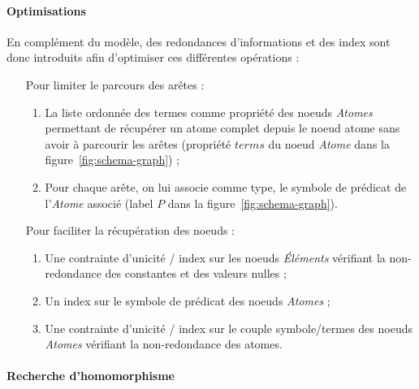 \paragraph{Optimisations}
En complément du modèle, des redondances d'informations et des index sont donc introduits afin d'optimiser ces différentes opérations :
\begin{itemize}[wide=0pt]
    \item[Pour limiter le parcours des arêtes] :
        \begin{enumerate}
            \item La liste ordonnée des termes comme propriété des noeuds \textit{Atomes} permettant de récupérer un atome complet depuis le noeud atome sans avoir à parcourir les arêtes (propriété $terms$ du noeud \textit{Atome} dans la figure~\ref{fig:schema-graph}) ;
            \item Pour chaque arête, on lui associe comme type, le symbole de prédicat de l'\textit{Atome} associé (label $P$ dans la figure~\ref{fig:schema-graph}).
        \end{enumerate}
    \item[Pour faciliter la récupération des noeuds] :
        \begin{enumerate}
            \item Une contrainte d'unicité / index sur les noeuds \textit{Éléments} vérifiant la non-redondance des constantes et des valeurs nulles ;
            \item Un index sur le symbole de prédicat des noeuds \textit{Atomes} ;
            \item Une contrainte d'unicité / index sur le couple symbole/termes des noeuds \textit{Atomes} vérifiant la non-redondance des atomes.
        \end{enumerate}
\end{itemize}

\paragraph{Recherche d'homomorphisme}
\label{sec:update:db:homomorphisme}
